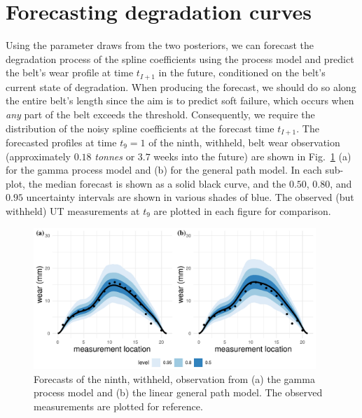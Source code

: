 \section{Forecasting degradation curves} \label{sec:belt-wear-forecast}

Using the parameter draws from the two posteriors, we can forecast the degradation process of the spline coefficients using the process model and predict the belt's wear profile at time $t_{I+1}$ in the future, conditioned on the belt's current state of degradation. When producing the forecast, we should do so along the entire belt's length since the aim is to predict soft failure, which occurs when \emph{any} part of the belt exceeds the threshold. Consequently, we require the distribution of the noisy spline coefficients at the forecast time $t_{I + 1}$. The forecasted profiles at time $t_9 = 1$ of the ninth, withheld, belt wear observation (approximately $0.18$ \textit{tonnes} or $3.7$ weeks into the future) are shown in Fig.~\ref{fig:beltwear-forecasts} (a) for the gamma process model and (b) for the general path model. In each sub-plot, the median forecast is shown as a solid black curve, and the $0.50$, $0.80$, and $0.95$ uncertainty intervals are shown in various shades of blue. The observed (but withheld) UT measurements at $t_9$ are plotted in each figure for comparison.

\begin{figure}[tbp]
  \centering
  \includegraphics[width=0.95\textwidth]{figures/ch-6/belt_wear_forecasts.pdf}
  \caption{Forecasts of the ninth, withheld, observation from (a) the gamma process model and (b) the linear general path model. The observed measurements are plotted for reference.}
  \label{fig:beltwear-forecasts}
\end{figure}

